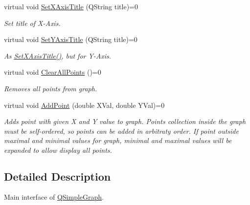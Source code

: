 \begin{DoxyCompactItemize}
virtual void \hyperlink{class_fossa_1_1_q_simple_graph_1_1_interfaces_1_1_i_q_simple_graph_adfca7d41a47790e8403507544468ba86}{Set\+X\+Axis\+Title} (Q\+String title)=0
\begin{DoxyCompactList}\small\item\em Set title of X-\/\+Axis. \end{DoxyCompactList}\item 
virtual void \hyperlink{class_fossa_1_1_q_simple_graph_1_1_interfaces_1_1_i_q_simple_graph_a606c07c40ed294cdd568de5488875af5}{Set\+Y\+Axis\+Title} (Q\+String title)=0
\begin{DoxyCompactList}\small\item\em As \hyperlink{class_fossa_1_1_q_simple_graph_1_1_interfaces_1_1_i_q_simple_graph_adfca7d41a47790e8403507544468ba86}{Set\+X\+Axis\+Title()}, but for Y-\/\+Axis. \end{DoxyCompactList}\item 
\mbox{\label{class_fossa_1_1_q_simple_graph_1_1_interfaces_1_1_i_q_simple_graph_a2425d06ef062ee46b66574d40e9eb4f4}} 
virtual void \hyperlink{class_fossa_1_1_q_simple_graph_1_1_interfaces_1_1_i_q_simple_graph_a2425d06ef062ee46b66574d40e9eb4f4}{Clear\+All\+Points} ()=0
\begin{DoxyCompactList}\small\item\em Removes all points from graph. \end{DoxyCompactList}\item 
virtual void \hyperlink{class_fossa_1_1_q_simple_graph_1_1_interfaces_1_1_i_q_simple_graph_a5d43e4e0f06bedb1734e4240070fe229}{Add\+Point} (double X\+Val, double Y\+Val)=0
\begin{DoxyCompactList}\small\item\em Adds point with given X and Y value to graph. Points collection inside the graph must be self-\/ordered, so points can be added in arbitraty order. If point outside maximal and minimal values for graph, minimal and maximal values will be expanded to allow display all points. \end{DoxyCompactList}\end{DoxyCompactItemize}


\subsection{Detailed Description}
Main interface of \hyperlink{class_fossa_1_1_q_simple_graph_1_1_q_simple_graph}{Q\+Simple\+Graph}. 

